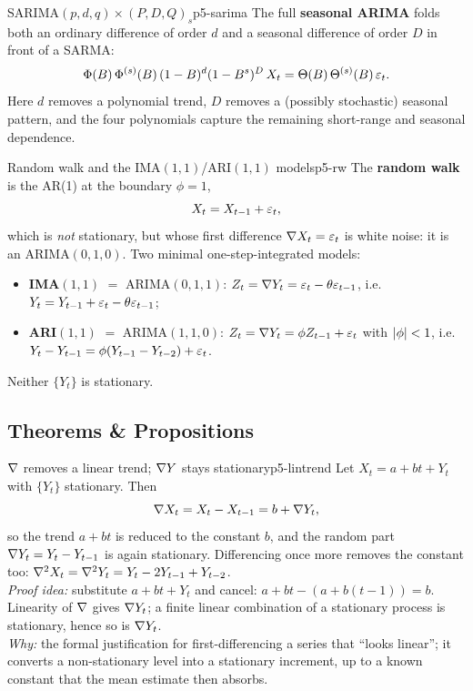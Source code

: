 \begin{definition}{SARIMA$(p,d,q)\times(P,D,Q)_s$}{p5-sarima}
The full \textbf{seasonal ARIMA} folds both an ordinary difference of order $d$
and a seasonal difference of order $D$ in front of a SARMA:
\[
\Phi(B)\,\Phi^{(s)}(B)\,(1-B)^{d}(1-B^{s})^{D}\,X_t
=\Theta(B)\,\Theta^{(s)}(B)\,\varepsilon_t .
\]
Here $d$ removes a polynomial trend, $D$ removes a (possibly stochastic)
seasonal pattern, and the four polynomials capture the remaining short-range and
seasonal dependence.
\end{definition}

\begin{definition}{Random walk and the IMA$(1,1)$/ARI$(1,1)$ models}{p5-rw}
The \textbf{random walk} is the AR(1) at the boundary $\phi=1$,
\[
X_t=X_{t-1}+\varepsilon_t ,
\]
which is \emph{not} stationary, but whose first difference $\nabla X_t=\varepsilon_t$ is
white noise: it is an ARIMA$(0,1,0)$. Two minimal one-step-integrated models:
\begin{itemize}
\item \textbf{IMA$(1,1)$} $=$ ARIMA$(0,1,1)$: $Z_t=\nabla Y_t=\varepsilon_t-\theta\varepsilon_{t-1}$,
      i.e.\ $Y_t=Y_{t-1}+\varepsilon_t-\theta\varepsilon_{t-1}$;
\item \textbf{ARI$(1,1)$} $=$ ARIMA$(1,1,0)$: $Z_t=\nabla Y_t=\phi Z_{t-1}+\varepsilon_t$
      with $\left\lvert \phi \right\rvert<1$, i.e.\ $Y_t-Y_{t-1}=\phi(Y_{t-1}-Y_{t-2})+\varepsilon_t$.
\end{itemize}
Neither $\{Y_t\}$ is stationary.
\end{definition}

\subsection{Theorems \& Propositions}

\begin{proposition}{$\nabla$ removes a linear trend; $\nabla Y$ stays stationary}{p5-lintrend}
Let $X_t=a+bt+Y_t$ with $\{Y_t\}$ stationary. Then
\[
\nabla X_t=X_t-X_{t-1}=b+\nabla Y_t ,
\]
so the trend $a+bt$ is reduced to the constant $b$, and the random part
$\nabla Y_t=Y_t-Y_{t-1}$ is again stationary. Differencing once more removes the
constant too: $\nabla^{2}X_t=\nabla^{2}Y_t=Y_t-2Y_{t-1}+Y_{t-2}$.\\[2pt]
\textit{Proof idea:} substitute $a+bt+Y_t$ and cancel:
$a+bt-(a+b(t-1))=b$. Linearity of $\nabla$ gives $\nabla Y_t$; a finite linear
combination of a stationary process is stationary, hence so is $\nabla Y_t$.\\
\textit{Why:} the formal justification for first-differencing a series that
``looks linear''; it converts a non-stationary level into a stationary
increment, up to a known constant that the mean estimate then absorbs.
\end{proposition}

